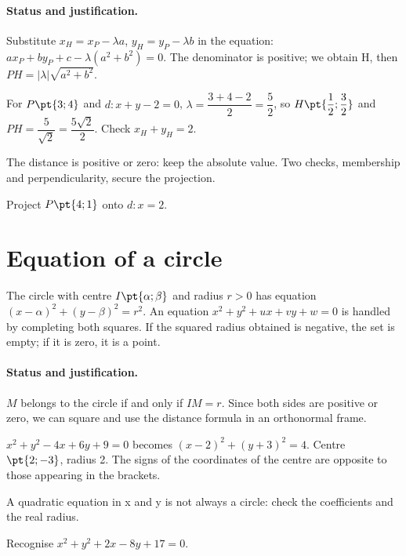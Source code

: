 \paragraph{Status and justification.} Substitute $x_H=x_P-\lambda a$, $y_H=y_P-\lambda b$ in the equation: $ax_P+by_P+c-\lambda(a^2+b^2)=0$. The denominator is positive; we obtain H, then $PH=|\lambda|\sqrt{a^2+b^2}$.
\begin{example}For $P\pt{3;4}$ and $d:x+y-2=0$, $\lambda =\dfrac{3+4-2}{2}=\dfrac{5}{2}$, so $H\pt{\dfrac{1}{2};\dfrac{3}{2}}$ and $PH=\dfrac{5}{\sqrt 2}=\dfrac{5\sqrt 2}{2}$. Check $x_H+y_H=2$.\end{example}\label{C07-EX2}
\begin{pitfall}The distance is positive or zero: keep the absolute value. Two checks, membership and perpendicularity, secure the projection.\end{pitfall}
\begin{application}Project $P\pt{4;1}$ onto $d:x=2$.\end{application}\label{C07-AP2}
\section{Equation of a circle}\label{C07-U3}
\begin{keypoint}
The circle with centre $I\pt{\alpha;\beta}$ and radius $r>0$ has equation $(x-\alpha)^2+(y-\beta)^2=r^2$. An equation $x^2+y^2+ux+vy+w=0$ is handled by completing both squares. If the squared radius obtained is negative, the set is empty; if it is zero, it is a point.
\end{keypoint}
\paragraph{Status and justification.} $M$ belongs to the circle if and only if $IM=r$. Since both sides are positive or zero, we can square and use the distance formula in an orthonormal frame.
\begin{example}$x^2+y^2-4x+6y+9=0$ becomes $(x-2)^2+(y+3)^2=4$. Centre $\pt{2;-3}$, radius 2. The signs of the coordinates of the centre are opposite to those appearing in the brackets.\end{example}\label{C07-EX3}
\begin{pitfall}A quadratic equation in x and y is not always a circle: check the coefficients and the real radius.\end{pitfall}
\begin{application}Recognise $x^2+y^2+2x-8y+17=0$.\end{application}\label{C07-AP3}
